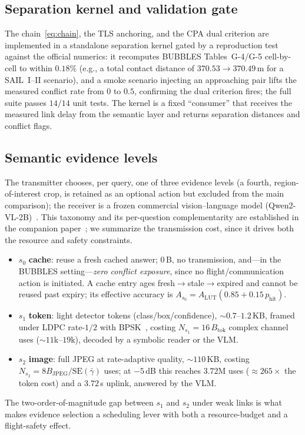 \subsection{Separation kernel and validation gate}
The chain~\eqref{eq:chain}, the TLS anchoring, and the CPA dual criterion
are implemented in a standalone separation kernel gated by a reproduction
test against the official numerics: it recomputes BUBBLES Tables~G-4/G-5
cell-by-cell to within $0.18\%$ (e.g., a total contact distance of
$370.53\to370.49$\,m for a SAIL~I--II scenario), and a smoke scenario
injecting an approaching pair lifts the measured conflict rate from $0$ to
$0.5$, confirming the dual criterion fires; the full suite passes $14/14$
unit tests. The kernel is a fixed ``consumer'' that receives the measured
link delay from the semantic layer and returns separation distances and
conflict flags.

\subsection{Semantic evidence levels}
The transmitter chooses, per query, one of three evidence levels (a fourth,
region-of-interest crop, is retained as an optional action but excluded
from the main comparison); the receiver is a frozen commercial
vision--language model (Qwen2-VL-2B)~\cite{wang2024qwen2vl}. This taxonomy
and its per-question complementarity are established in the companion
paper~\cite{zhang2026askb4tx}; we summarize the transmission cost, since it
drives both the resource and safety constraints.
\begin{itemize}
\item $s_0$ \textbf{cache}: reuse a fresh cached answer; $0$\,B, no
transmission, and---in the BUBBLES setting---\emph{zero conflict
exposure}, since no flight/communication action is initiated. A cache entry
ages fresh$\to$stale$\to$expired and cannot be reused past expiry; its
effective accuracy is $A_{s_0}=A_{\mathrm{LUT}}(0.85+0.15\,p_{\mathrm{hit}})$.
\item $s_1$ \textbf{token}: light detector tokens (class/box/confidence),
$\sim\!0.7$--$1.2$\,KB, framed under LDPC rate-$1/2$ with
BPSK~\cite{gallager1962ldpc}, costing $N_{s_1}=16\,B_{\mathrm{tok}}$ complex
channel uses ($\sim\!11$k--$19$k), decoded by a symbolic reader or the VLM.
\item $s_2$ \textbf{image}: full JPEG at rate-adaptive quality, $\sim\!110$\,KB,
costing $N_{s_2}=8B_{\mathrm{JPEG}}/\mathrm{SE}(\bar\gamma)$ uses; at $-5$\,dB
this reaches $3.72$M uses ($\approx\!265\times$ the token cost) and a
$3.72$\,s uplink, answered by the VLM.
\end{itemize}
The two-order-of-magnitude gap between $s_1$ and $s_2$ under weak links is
what makes evidence selection a scheduling lever with both a
resource-budget and a flight-safety effect.
